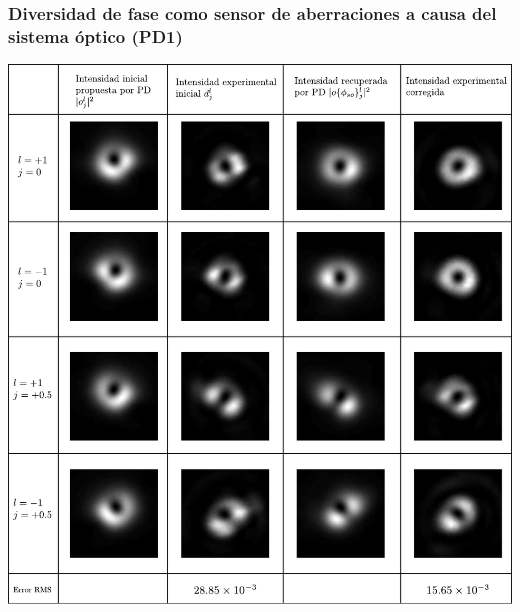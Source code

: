 \documentclass[serif,8pt]{beamer}
\begin{document}
		\begin{frame}
		\frametitle{Diversidad de fase como sensor de aberraciones a causa del sistema óptico (PD1)}
		\begin{center}		
			\includegraphics[scale=0.4]{img/CorPD1.pdf}
		\end{center}
		
		\end{frame}
\end{document}
